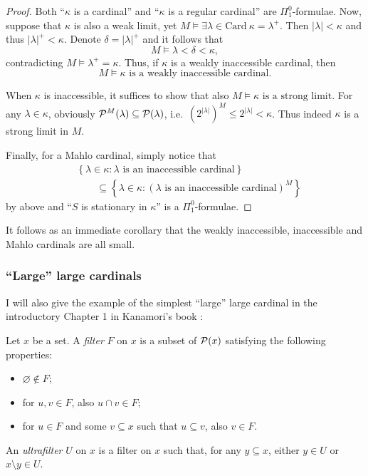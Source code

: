 \documentclass[12pt]{article}
\theoremstyle{plain}
\theoremstyle{definition}
\newcommand{\Card}{\mathrm{Card}}
\begin{document}
\begin{proof}
	Both ``$\kappa$ is a cardinal'' and ``$\kappa$ is a regular cardinal'' are $\Pi^0_1$-formulae. Now, suppose that $\kappa$ is also a weak limit, yet $M \vDash \exists \lambda \in \Card \ \kappa = \lambda^+$. Then $\left|\lambda\right| < \kappa$ and thus $\left|\lambda\right|^+ < \kappa$. Denote $\delta = \left|\lambda\right|^+$ and it follows that
	\[M \vDash \lambda < \delta < \kappa,\]
	contradicting $M \vDash \lambda^+ = \kappa$. Thus, if $\kappa$ is a weakly inaccessible cardinal, then
	\[M \vDash \text{$\kappa$ is a weakly inaccessible cardinal}.\]

	When $\kappa$ is inaccessible, it suffices to show that also $M \vDash \text{$\kappa$ is a strong limit}$. For any $\lambda \in \kappa$, obviously $\mathcal{P}^M\mleft(\lambda\mright) \subseteq \mathcal{P}\mleft(\lambda\mright)$, i.e.\ $\left(2^{\left|\lambda\right|}\right)^M \leq 2^{\left|\lambda\right|} < \kappa$. Thus indeed $\kappa$ is a strong limit in $M$.

	Finally, for a Mahlo cardinal, simply notice that
	\begin{align*}
		 & \left\{\lambda \in \kappa : \text{$\lambda$ is an inaccessible cardinal}\right\}                                 \\
		 & \qquad \subseteq \left\{\lambda \in \kappa : \left(\text{$\lambda$ is an inaccessible cardinal}\right)^M\right\}
	\end{align*}
	by above and ``$S$ is stationary in $\kappa$'' is a $\Pi^0_1$-formulae.
\end{proof}

It follows as an immediate corollary that the weakly inaccessible, inaccessible and Mahlo cardinals are all small.

\subsubsection*{``Large'' large cardinals}

I will also give the example of the simplest ``large'' large cardinal in the introductory Chapter 1 in Kanamori's book \cite{higher-infinite}:

\begin{definition}[Ultrafilters]
	Let $x$ be a set. A \emph{filter} $F$ on $x$ is a subset of $\mathcal{P}\mleft(x\mright)$ satisfying the following properties:
	\begin{itemize}
		\item	$\varnothing \not\in F$;
		\item for $u, v \in F$, also $u \cap v \in F$;
		\item for $u \in F$ and some $v \subseteq x$ such that $u \subseteq v$, also $v \in F$.
	\end{itemize}

	An \emph{ultrafilter} $U$ on $x$ is a filter on $x$ such that, for any $y \subseteq x$, either $y \in U$ or $x \setminus y \in U$.
\end{definition}
\end{document}
